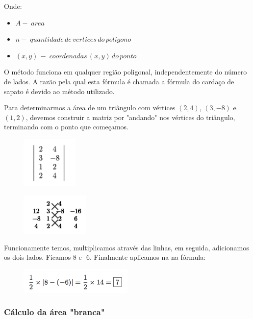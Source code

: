 \documentclass[12pt]{article}
\begin{document}
Onde:

\begin{itemize}  
  \item $A -\; area$
  \item $n -\; quantidade\, de\, vertices\, do\, poligono\,$
  \item $(x, y)\,-\;coordenadas\, (x,y)\, do\, ponto\,$
\end{itemize}

O método funciona em qualquer região poligonal, independentemente do número de lados. A razão pela qual esta fórmula é chamada a fórmula do cardaço de sapato é devido ao método utilizado.

Para determinarmos a área de um triângulo com vértices $(2,4)$, $(3,-8)$ e $(1,2)$, devemos construir a matriz por "andando" nos vértices do triângulo, terminando com o ponto que começamos.

\begin{figure}[H]
\centering
\includegraphics[width=0.25\textwidth]{shoe2.png}
\end{figure}

\begin{figure}[H]
\centering
\includegraphics[width=0.30\textwidth]{shoe3.png}
\end{figure}

Funcionamente temos, multiplicamos através das linhas, em seguida, adicionamos os dois lados. Ficamos 8 e -6. Finalmente aplicamos na na fórmula:

\begin{figure}[H]
\centering
\includegraphics[width=0.5\textwidth]{shoe4.png}
\end{figure}


\subsubsection{Cálculo da área "branca"}
\end{document}
